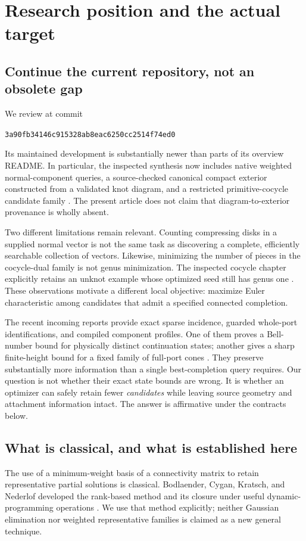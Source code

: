 \documentclass[11pt,letterpaper]{article}
\theoremstyle{definition}
\newcommand{\pin}{\texttt{3a90fb34146c915328ab8eac6250cc2514f74ed0}}
\begin{document}
\section{Research position and the actual target}
\label{sec:position}

\subsection{Continue the current repository, not an obsolete gap}
We review  at commit
\begin{center}\pin\end{center} Its maintained development is substantially newer than parts of its overview README. In particular, the inspected synthesis now includes native weighted normal-component queries, a source-checked canonical compact exterior constructed from a validated knot diagram, and a restricted primitive-cocycle candidate family \cite{repo,native}. The present article does not claim that diagram-to-exterior provenance is wholly absent.

Two different limitations remain relevant. Counting compressing disks in a supplied normal vector is not the same task as discovering a complete, efficiently searchable collection of vectors. Likewise, minimizing the number of pieces in the cocycle-dual family is not genus minimization. The inspected cocycle chapter explicitly retains an unknot example whose optimized seed still has genus one \cite{native}. These observations motivate a different local objective: maximize Euler characteristic among candidates that admit a specified connected completion.

The recent incoming reports provide exact sparse incidence, guarded whole-port identifications, and compiled component profiles. One of them proves a Bell-number bound for physically distinct continuation states; another gives a sharp finite-height bound for a fixed family of full-port cones \cite{ports,compiled}. They preserve substantially more information than a single best-completion query requires. Our question is not whether their exact state bounds are wrong. It is whether an optimizer can safely retain fewer \emph{candidates} while leaving source geometry and attachment information intact. The answer is affirmative under the contracts below.

\subsection{What is classical, and what is established here}
The use of a minimum-weight basis of a connectivity matrix to retain representative partial solutions is classical. Bodlaender, Cygan, Kratsch, and Nederlof developed the rank-based method and its closure under useful dynamic-programming operations \cite{bckn}. We use that method explicitly; neither Gaussian elimination nor weighted representative families is claimed as a new general technique.
\end{document}
